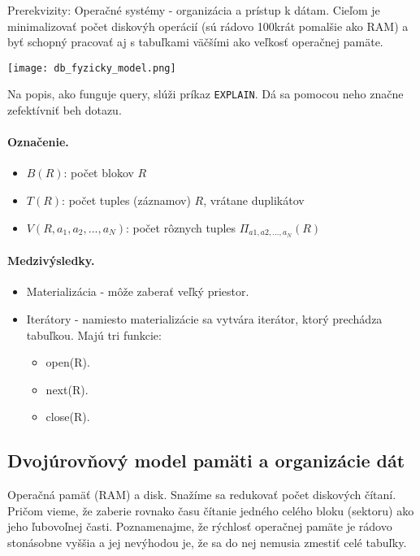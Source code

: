 \documentclass[10pt,a4paper]{article}
\begin{document}
Prerekvizity: Operačné systémy - organizácia a prístup k dátam.
Cieľom je minimalizovať počet diskovýh operácií (sú rádovo 100krát pomalšie ako RAM)
a byť schopný pracovať aj s tabuľkami väčšími ako veľkosť operačnej pamäte. 

\begin{center}
\texttt{[image: db\_fyzicky\_model.png]}
\end{center}

Na popis, ako funguje query, slúži príkaz \verb|EXPLAIN|. Dá sa pomocou neho značne zefektívniť beh dotazu. 

\paragraph{Označenie.}
\begin{itemize}
\item $B(R)$: počet blokov $R$
\item $T(R)$: počet tuples (záznamov) $R$, vrátane duplikátov
\item $V(R, a_1, a_2, ..., a_N)$: počet rôznych tuples $\Pi_{a1, a2, \ldots, a_N}(R)$
\end{itemize}

\paragraph{Medzivýsledky.}
\begin{itemize}
\item Materializácia - môže zaberať veľký priestor.
\item Iterátory - namiesto materializácie sa vytvára iterátor, ktorý prechádza tabuľkou. Majú tri funkcie: 
\begin{itemize}
\item open(R).
\item next(R).
\item close(R). 
\end{itemize}
\end{itemize}

\subsection{Dvojúrovňový model pamäti a organizácie dát}

Operačná pamäť (RAM) a disk. Snažíme sa redukovať počet diskových čítaní. Pričom vieme, že zaberie rovnako času čítanie jedného celého bloku (sektoru) ako jeho ľubovoľnej časti. 
Poznamenajme, že rýchlosť operačnej pamäte je rádovo stonásobne vyššia a jej nevýhodou je, že sa do nej nemusia zmestiť celé tabuľky. 
\end{document}
